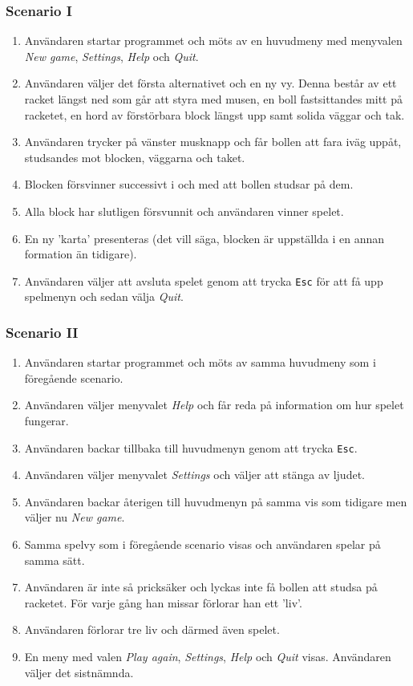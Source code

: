 \documentclass[11pt,a4paper]{article}
\begin{document}
\subsubsection{Scenario I}
\begin{enumerate}
	\item Användaren startar programmet och möts av en huvudmeny med menyvalen \emph{New game}, \emph{Settings}, \emph{Help} och \emph{Quit}.
	\item Användaren väljer det första alternativet och en ny vy. Denna består av ett racket längst ned som går att styra med musen, en boll fastsittandes mitt på racketet, en hord av förstörbara block längst upp samt solida väggar och tak.
	\item Användaren trycker på vänster musknapp och får bollen att fara iväg uppåt, studsandes mot blocken, väggarna och taket.
	\item Blocken försvinner successivt i och med att bollen studsar på dem.
	\item Alla block har slutligen försvunnit och användaren vinner spelet.
	\item En ny 'karta' presenteras (det vill säga, blocken är uppställda i en annan formation än tidigare).
	\item Användaren väljer att avsluta spelet genom att trycka \texttt{Esc} för att få upp spelmenyn och sedan välja \emph{Quit}.
\end{enumerate}

\subsubsection{Scenario II}
\begin{enumerate}
	\item Användaren startar programmet och möts av samma huvudmeny som i föregående scenario.
	\item Användaren väljer menyvalet \emph{Help} och får reda på information om hur spelet fungerar.
	\item Användaren backar tillbaka till huvudmenyn genom att trycka \texttt{Esc}.
	\item Användaren väljer menyvalet \emph{Settings} och väljer att stänga av ljudet.
	\item Användaren backar återigen till huvudmenyn på samma vis som tidigare men väljer nu \emph{New game}.
	\item Samma spelvy som i föregående scenario visas och användaren spelar på samma sätt.
	\item Användaren är inte så pricksäker och lyckas inte få bollen att studsa på racketet. För varje gång han missar förlorar han ett 'liv'.
	\item Användaren förlorar tre liv och därmed även spelet.
	\item En meny med valen \emph{Play again}, \emph{Settings}, \emph{Help} och \emph{Quit} visas. Användaren väljer det sistnämnda.
\end{enumerate}
\end{document}
